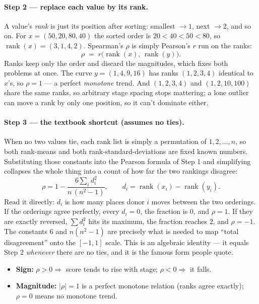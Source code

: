 \documentclass[11pt]{article}
\begin{document}
\paragraph{Step 2 --- replace each value by its rank.} A value's \emph{rank} is just its position after sorting: smallest $\to 1$, next $\to 2$, and so on. For $x=(50,20,80,40)$ the sorted order is $20<40<50<80$, so $\operatorname{rank}(x)=(3,1,4,2)$. Spearman's $\rho$ is simply Pearson's $r$ run on the ranks:
\[
\rho \;=\; r\big(\operatorname{rank}(x),\,\operatorname{rank}(y)\big).
\]
Ranks keep only the order and discard the magnitudes, which fixes both problems at once. The curve $y=(1,4,9,16)$ has ranks $(1,2,3,4)$ identical to $x$'s, so $\rho=1$ --- a perfect \emph{monotone} trend. And $(1,2,3,4)$ and $(1,2,10,100)$ share the same ranks, so arbitrary stage spacing stops mattering; a lone outlier can move a rank by only one position, so it can't dominate either.

\paragraph{Step 3 --- the textbook shortcut (assumes no ties).} When no two values tie, each rank list is simply a permutation of $1,2,\dots,n$, so both rank-means and both rank-standard-deviations are fixed known numbers. Substituting those constants into the Pearson formula of Step 1 and simplifying collapses the whole thing into a count of how far the two rankings disagree:
\[
\rho = 1 - \frac{6\sum_i d_i^2}{n\,(n^2-1)},\qquad d_i = \operatorname{rank}(x_i)-\operatorname{rank}(y_i).
\]
Read it directly: $d_i$ is how many places donor $i$ moves between the two orderings. If the orderings agree perfectly, every $d_i=0$, the fraction is $0$, and $\rho=1$. If they are exactly reversed, $\sum d_i^2$ hits its maximum, the fraction reaches $2$, and $\rho=-1$. The constants $6$ and $n(n^2-1)$ are precisely what is needed to map ``total disagreement'' onto the $[-1,1]$ scale. This is an algebraic identity --- it equals Step 2 \emph{whenever} there are no ties, and it is the famous form people quote.

\begin{itemize}[leftmargin=*]
  \item \textbf{Sign:} $\rho > 0 \Rightarrow$ score tends to rise with stage; $\rho < 0 \Rightarrow$ it falls.
  \item \textbf{Magnitude:} $|\rho| = 1$ is a perfect monotone relation (ranks agree exactly); $\rho = 0$ means no monotone trend.
\end{itemize}
\end{document}
